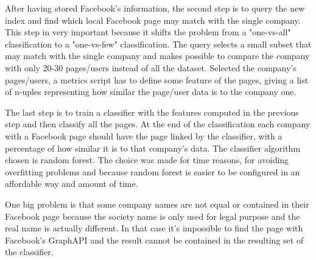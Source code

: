 After having stored Facebook's information, the second step is to query the new index and find which local Facebook page may match with the single company. This step in very important because it shifts the problem from a "one-vs-all" classification to a "one-vs-few" classification. The query selects a small subset that may match with the single company and makes possible to compare the company with only 20-30 pages/users instead of all the dataset.
Selected the company's pages/users, a metrics script has to define some feature of the pages, giving a list of n-uples representing how similar the page/user data is to the company one.

The last step is to train a classifier with the features computed in the previous step and then classify all the pages. At the end of the classification each company with a Facebook page should have the page linked by the classifier, with a percentage of how similar it is to that company's data.
The classifier algorithm chosen is random forest. The choice was made for time reasons, for avoiding overfitting problems and because random forest is easier to be configured in an affordable way and amount of time.

One big problem is that some company names are not equal or contained in their Facebook page because the society name is only used for legal purpose and the real name is actually different. In that case it's impossible to find the page with Facebook's GraphAPI and the result cannot be contained in the resulting set of the classifier.



